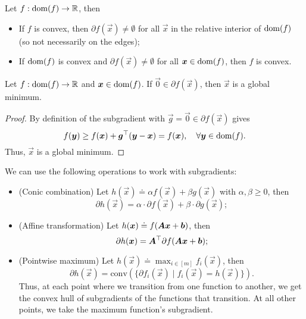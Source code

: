 \begin{lemma}
    Let $f: \mathrm{dom}(f) \to \mathbb{R}$, then
    \begin{itemize}
        \item If $f$ is convex, then $\partial f(\vec{x}) \neq \emptyset$ for all $\vec{x}$ in the relative
              interior of $\mathrm{dom}(f)$ (so not necessarily on the edges);
        \item If $\mathrm{dom}(f)$ is convex and $\partial f(\vec{x}) \neq \emptyset$ for all $\bm{x} \in \mathrm{dom}(f)$, then
              $f$ is convex.
    \end{itemize}
\end{lemma}

\begin{lemma}
    Let $f: \mathrm{dom}(f) \to \mathbb{R}$ and $\bm{x} \in \mathrm{dom}(f)$. If $\vec{0} \in \partial f(\vec{x})$, then $\vec{x}$ is a global minimum.
\end{lemma}

\begin{proof}
    By definition of the subgradient with $\vec{g} = \vec{0} \in \partial f(\vec{x})$ gives \[
        f(\bm{y}) \geq f(\bm{x}) + \bm{g}^\top (\bm{y} - \bm{x}) = f(\bm{x}), \quad \forall \bm{y} \in \mathrm{dom}(f).
    \]
    Thus, $\vec{x}$ is a global minimum.
\end{proof}

\begin{lemma}
    We can use the following operations to work with subgradients:
    \begin{itemize}
        \item (Conic combination) Let $h(\vec{x}) \doteq \alpha f(\vec{x}) + \beta g(\vec{x})$ with $\alpha,\beta \geq
                  0$, then \[
                  \partial h(\vec{x}) = \alpha \cdot \partial f(\vec{x}) + \beta \cdot \partial g(\vec{x});
              \]
        \item (Affine transformation) Let $h(\bm{x}) \doteq f(\bm{A} \bm{x} + \bm{b})$, then \[
                  \partial h(\bm{x}) = \bm{A}^\top \partial f(\bm{A} \bm{x} + \bm{b});
              \]
        \item (Pointwise maximum) Let $h(\vec{x}) \doteq \max_{i\in [m]} f_i(\vec{x})$, then \[
                  \partial h(\vec{x}) = \mathrm{conv}(\{ \partial f_i(\vec{x}) \mid f_i(\vec{x}) = h(\vec{x}) \}).
              \]
              Thus, at each point where we transition from one function to another, we get the convex hull of
              subgradients of the functions that transition. At all other points, we take the maximum function's
              subgradient.
    \end{itemize}
\end{lemma}

